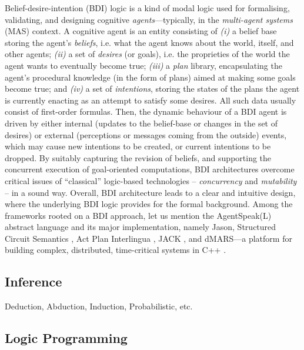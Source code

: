 \documentclass[12pt,a4paper,openright,twoside]{book}
\begin{document}
Belief-desire-intention (BDI) logic is a kind of modal logic used for formalising, validating, and designing cognitive \emph{agents}---typically, in the \emph{multi-agent systems} (MAS) context.
%
A cognitive agent is an entity consisting of 
\emph{(i)} a belief base storing the agent's \emph{beliefs}, i.e. what the agent knows about the world, itself, and other agents;
\emph{(ii)} a set of \emph{desires} (or goals), i.e. the proprieties of the world the agent wants to eventually become true;
\emph{(iii)} a \emph{plan} library, encapsulating the agent's procedural knowledge (in the form of plans) aimed at making some goals become true; and
\emph{(iv)} a set of \emph{intentions}, storing the states of the plans the agent is currently enacting as an attempt to satisfy some desires.
%
All such data usually consist of first-order formulas.
%
Then, the dynamic behaviour of a BDI agent is driven by either internal (updates to the belief-base or changes in the set of desires) or external (perceptions or messages coming from the outside) events, which may cause new intentions to be created, or current intentions to be dropped.
%
By suitably capturing the revision of beliefs, and supporting the concurrent execution of goal-oriented computations, BDI architectures overcome critical issues of ``classical'' logic-based technologies -- \emph{concurrency} and \emph{mutability} -- in a sound way.
%
Overall, BDI architecture leads to a clear and intuitive design, where the underlying BDI logic provides for the formal background.
%
Among the frameworks rooted on a BDI approach, let us mention the AgentSpeak(L) \cite{Rao96} abstract language and its major implementation, namely Jason, Structured Circuit Semantics \cite{lee1994}, Act Plan Interlingua \cite{huber1999-jam}, JACK \cite{howden2001}, and dMARS---a platform for building complex, distributed, time-critical systems in C++ \cite{dmars}.

\subsection{Inference}

Deduction, Abduction, Induction, Probabilistic, etc.

\subsection{Logic Programming}

\cite{logictech-information11}
\cite{lptech4mas-aamas2021}
\cite{lptech4mas-jaamas35}
\cite{Korner2020HistoryFuturePrologTPLP}
\end{document}
